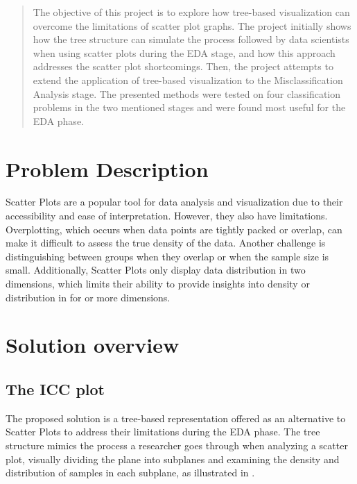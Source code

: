 \documentclass[11pt]{article}
\begin{document}
\maketitle

\begin{abstract}
The objective of this project is to explore how tree-based visualization can overcome the limitations of scatter plot graphs. The project initially shows how the tree structure can simulate the process followed by data scientists when using scatter plots during the EDA stage, and how this approach addresses the scatter plot shortcomings. Then, the project attempts to extend the application of tree-based visualization to the Misclassification Analysis stage. The presented methods were tested on four classification problems in the two mentioned stages and were found most useful for the EDA phase.


\end{abstract}

\section{Problem Description}\label{Problem Description}
Scatter Plots are a popular tool for data analysis and visualization due to their accessibility and ease of interpretation. However, they also have limitations. Overplotting, which occurs when data points are tightly packed or overlap, can make it difficult to assess the true density of the data. Another challenge is distinguishing between groups when they overlap or when the sample size is small. Additionally, Scatter Plots only display data distribution in two dimensions, which limits their ability to provide insights into density or distribution in for or more dimensions.

\section{Solution overview}\label{Solution overview}
\subsection{The ICC plot}\label{The ICC plot}
The proposed solution is a tree-based representation offered as an alternative to Scatter Plots to address their limitations during the EDA phase. The tree structure mimics the process a researcher goes through when analyzing a scatter plot, visually dividing the plane into subplanes and examining the density and distribution of samples in each subplane, as illustrated in .
\end{document}
